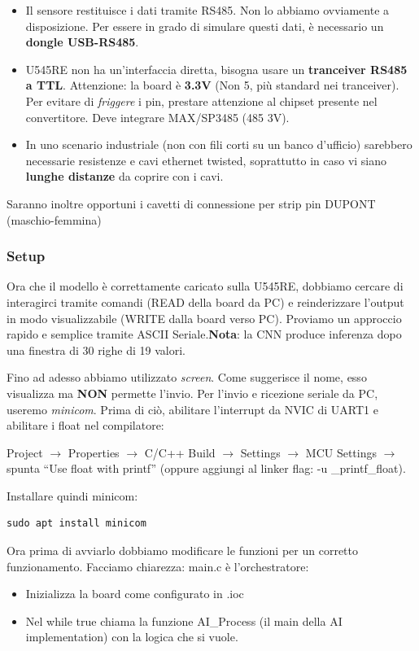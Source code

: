 \begin{itemize}
    \item Il sensore restituisce i dati tramite RS485. Non lo abbiamo ovviamente a disposizione. Per essere in grado di simulare questi dati, è necessario un \textbf{dongle USB-RS485}. 
    \item U545RE non ha un'interfaccia diretta, bisogna usare un \textbf{tranceiver RS485 a TTL}. Attenzione: la board è \textbf{3.3V} (Non 5, più standard nei tranceiver). Per evitare di \textit{friggere} i pin, prestare attenzione al chipset presente nel convertitore. Deve integrare MAX/SP3485 (485 3V). 
    \item In uno scenario industriale (non con fili corti su un banco d'ufficio) sarebbero necessarie resistenze e cavi ethernet twisted, soprattutto in caso vi siano \textbf{lunghe distanze} da coprire con i cavi.
\end{itemize}
Saranno inoltre opportuni i cavetti di connessione per strip pin DUPONT (maschio-femmina)

\subsubsection{Setup}
Ora che il modello è correttamente caricato sulla U545RE, dobbiamo cercare di interagirci tramite comandi (READ della board da PC) e reinderizzare l'output in modo visualizzabile (WRITE dalla board verso PC). Proviamo un approccio rapido e semplice tramite ASCII Seriale.\textbf{Nota}: la CNN produce inferenza dopo una finestra di 30 righe di 19 valori. 

Fino ad adesso abbiamo utilizzato \textit{screen}. Come suggerisce il nome, esso visualizza ma \textbf{NON} permette l'invio. Per l'invio e ricezione seriale da PC, useremo \textit{minicom}. Prima di ciò, abilitare l'interrupt da NVIC di UART1 e abilitare i float nel compilatore: 
\begin{center}
    Project $\rightarrow$ Properties $\rightarrow$ C/C++ Build $\rightarrow$ Settings $\rightarrow$ MCU Settings $\rightarrow$ spunta “Use float with printf” (oppure aggiungi al linker flag: -u _printf_float).
\end{center}
Installare quindi minicom: 

\begin{verbatim}
sudo apt install minicom
\end{verbatim}
Ora prima di avviarlo dobbiamo modificare le funzioni per un corretto funzionamento. Facciamo chiarezza: 
main.c è l'orchestratore: 
\begin{itemize}
    \item Inizializza la board come configurato in .ioc
    \item Nel while true chiama la funzione AI_Process (il main della AI implementation) con la logica che si vuole.
\end{itemize}


